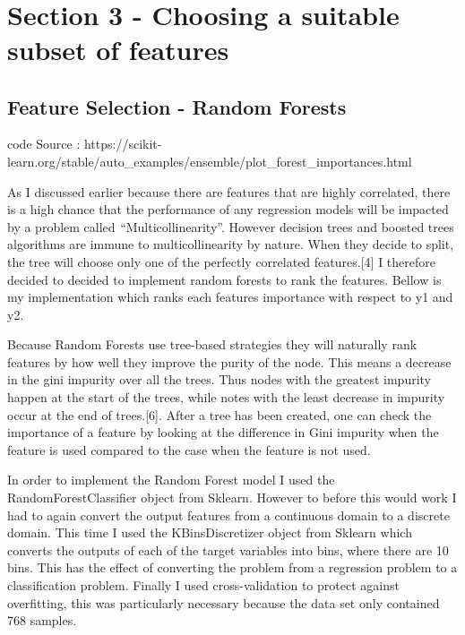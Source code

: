 \documentclass[11pt]{article}
\begin{document}
    \begin{center}
    \end{center}
    { \hspace*{\fill} \\}
    
    \hypertarget{section-3---choosing-a-suitable-subset-of-features}{%
\section{Section 3 - Choosing a suitable subset of
features}\label{section-3---choosing-a-suitable-subset-of-features}}

\hypertarget{feature-selection---random-forests}{%
\subsection{Feature Selection - Random
Forests}\label{feature-selection---random-forests}}

code Source :
https://scikit-learn.org/stable/auto\_examples/ensemble/plot\_forest\_importances.html

As I discussed earlier because there are features that are highly
correlated, there is a high chance that the performance of any
regression models will be impacted by a problem called
 ``Multicollinearity''. However decision trees and boosted trees
algorithms are immune to multicollinearity by nature. When they decide
to split, the tree will choose only one of the perfectly correlated
features.{[}4{]} I therefore decided to decided to implement random
forests to rank the features. Bellow is my implementation which ranks
each features importance with respect to y1 and y2.

Because Random Forests use tree-based strategies they will naturally
rank features by how well they improve the purity of the node. This
means a decrease in the gini impurity over all the trees. Thus nodes
with the greatest impurity happen at the start of the trees, while notes
with the least decrease in impurity occur at the end of trees.{[}6{]}.
After a tree has been created, one can check the importance of a feature
by looking at the difference in Gini impurity when the feature is used
compared to the case when the feature is not used.

In order to implement the Random Forest model I used the
RandomForestClassifier object from Sklearn. However to before this would
work I had to again convert the output features from a continuous domain
to a discrete domain. This time I used the KBinsDiscretizer object from
Sklearn which converts the outputs of each of the target variables into
bins, where there are 10 bins. This has the effect of converting the
problem from a regression problem to a classification problem. Finally I
used cross-validation to protect against overfitting, this was
particularly necessary because the data set only contained 768 samples.
\end{document}
